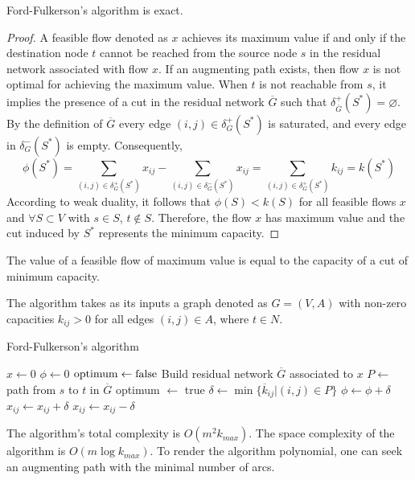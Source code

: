 \begin{proposition}
    Ford-Fulkerson's algorithm is exact. 
\end{proposition}
\begin{proof}
    A feasible flow denoted as $x$  achieves its maximum value if and only if the destination node $t$ cannot be reached from the source node $s$ in the residual network associated with flow $x$. 
    If an augmenting path exists, then flow $x$ is not optimal for achieving the maximum value.
    When $t$ is not reachable from $s$, it implies the presence of a cut in the residual network $\overline{G}$ such that $\delta^{+}_{\overline{G}}(S^{*})=\varnothing$. 
    By the definition of $\overline{G}$  every edge $(i,j) \in \delta^{+}_{G}(S^{*})$ is saturated, and every edge in $\delta^{-}_{G}(S^{*})$ is empty. 
    Consequently,
    \[\phi(S^{*})=\sum_{(i,j) \in \delta^{+}_{G}(S^{*})}{x_{ij}}-\sum_{(i,j) \in \delta^{-}_{G}(S^{*})}{x_{ij}}= \sum_{(i,j) \in \delta^{+}_{G}(S^{*})}{k_{ij}}=k(S^{*})\]
    According to weak duality, it follows that $\phi(S) < k(S)$ for all feasible flows $x$ and $\forall S \subset V$ with $s \in S$, $t \notin S$. 
    Therefore, the flow $x$ has maximum value and the cut induced by $S^{*}$ represents the minimum capacity.
\end{proof}
\begin{theorem}
    The value of a feasible flow of maximum value is equal to the capacity of a cut of minimum capacity.
\end{theorem}
The algorithm takes as its inputs a graph denoted as $G=(V,A)$ with non-zero capacities $k_{ij}>0$ for all edges $(i,j) \in A$, where $t \in N$. 
\begin{algorithm}[H]
    \caption{Ford-Fulkerson's algorithm}
        \begin{algorithmic}[1]
            \State $x \leftarrow 0$
            \State $\phi \leftarrow 0$
            \State $\textnormal{optimum} \leftarrow \textnormal{false}$
                \State Build residual network $\overline{G}$ associated to $x$
                \State $P \leftarrow$ path from $s$ to $t$ in $\overline{G}$
                    \State optimum $\leftarrow$ true
                \Else
                    \State $\delta \leftarrow \min\{\overline{k}_{ij}|(i,j) \in P\}$
                    \State $\phi \leftarrow \phi + \delta$
                            \State $x_{ij} \leftarrow x_{ij}+\delta$
                        \Else 
                            \State $x_{ij} \leftarrow x_{ij}-\delta$
                        \EndIf
                    \EndFor
                \EndIf
            \EndWhile
        \end{algorithmic}
\end{algorithm}
The algorithm's total complexity is $O(m^2k_{max})$. 
The space complexity of the algorithm is $O(m\log{k_{max}})$. 
To render the algorithm polynomial, one can seek an augmenting path with the minimal number of arcs.


